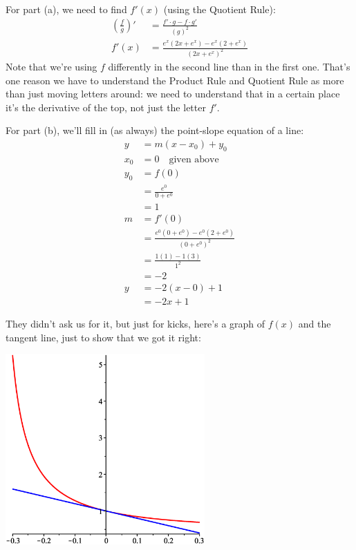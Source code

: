 \documentclass[oneside]{book}
\theoremstyle{definition}
\theoremstyle{solution}
\newtheorem*{solution}{Solution}
\newenvironment{solution}{\vspace{2in}\comment}{\endcomment}
\begin{document}
\begin{solution}
  For part (a), we need to find $f'(x)$ (using the Quotient Rule):
  \begin{align*}
          \left(\frac{f}{g}\right)' & = \frac{f'\cdot g - f\cdot g'}{(g)^2}\\
          f'(x) & = \frac{e^x(2x+e^x) - e^x(2+e^x)}{(2x+e^x)^2}
\end{align*}
Note that we're using $f$ differently in the second line than in the
first one.  That's one reason we have to understand the Product Rule
and Quotient Rule as more than just moving letters around: we need to
understand that in a certain place it's the derivative of the top, not
just the letter $f'$.  \bigskip

For part (b), we'll fill in (as always) the point-slope equation of a line:
\begin{align*}
 y & = m(x-x_0)+y_0\\
 x_0 & = 0 \quad \text{given above}\\
 y_0 & = f(0) \\
     & = \frac{e^0}{0 + e^0} \\
     & = 1\\
m & = f'(0)\\
   & = \frac{e^0(0+e^0) - e^0(2+e^0)}{(0 + e^0)^2}\\
   & = \frac{1(1) - 1(3)}{1^2}\\
   & = -2\\
y & = -2(x-0)+1\\
  & = -2x+1
\end{align*}

They didn't ask us for it, but just for kicks, here's a graph of
$f(x)$ and the tangent line, just to show that we got it right:
\begin{center}
\includegraphics[width=3in]{quotient_rule_with_tangent_line}
\end{center}
\end{solution}
\end{document}
